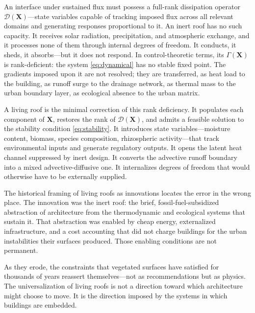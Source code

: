 \documentclass[12pt, a4paper]{article}
\theoremstyle{plain}
\theoremstyle{remark}
\begin{document}
An interface under sustained flux must possess a full-rank dissipation operator $\mathcal{D}(\mathbf{X})$---state variables capable of tracking imposed flux across all relevant domains and generating responses proportional to it. An inert roof has no such capacity. It receives solar radiation, precipitation, and atmospheric exchange, and it processes none of them through internal degrees of freedom. It conducts, it sheds, it absorbs---but it does not respond. In control-theoretic terms, its $\Gamma(\mathbf{X})$ is rank-deficient: the system \eqref{eq:dynamical} has no stable fixed point. The gradients imposed upon it are not resolved; they are transferred, as heat load to the building, as runoff surge to the drainage network, as thermal mass to the urban boundary layer, as ecological absence to the urban matrix.

A living roof is the minimal correction of this rank deficiency. It populates each component of $\mathbf{X}$, restores the rank of $\mathcal{D}(\mathbf{X})$, and admits a feasible solution to the stability condition \eqref{eq:stability}. It introduces state variables---moisture content, biomass, species composition, rhizospheric activity---that track environmental inputs and generate regulatory outputs. It opens the latent heat channel suppressed by inert design. It converts the advective runoff boundary into a mixed advective-diffusive one. It internalizes degrees of freedom that would otherwise have to be externally supplied.

The historical framing of living roofs as innovations locates the error in the wrong place. The innovation was the inert roof: the brief, fossil-fuel-subsidized abstraction of architecture from the thermodynamic and ecological systems that sustain it. That abstraction was enabled by cheap energy, externalized infrastructure, and a cost accounting that did not charge buildings for the urban instabilities their surfaces produced. Those enabling conditions are not permanent.

As they erode, the constraints that vegetated surfaces have satisfied for thousands of years reassert themselves---not as recommendations but as physics. The universalization of living roofs is not a direction toward which architecture might choose to move. It is the direction imposed by the systems in which buildings are embedded.
\end{document}
